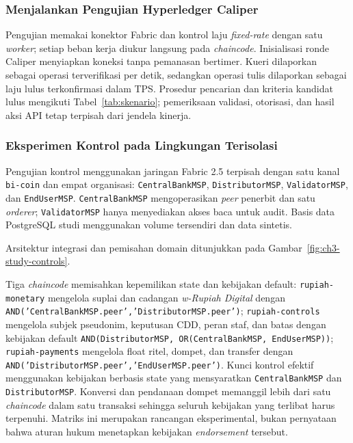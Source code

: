 \subsubsection{Menjalankan Pengujian Hyperledger Caliper}

Pengujian memakai konektor Fabric dan kontrol laju \textit{fixed-rate} dengan
satu \textit{worker}; setiap beban kerja diukur langsung pada
\textit{chaincode}. Inisialisasi ronde Caliper menyiapkan koneksi tanpa
pemanasan bertimer. Kueri dilaporkan sebagai operasi terverifikasi per detik,
sedangkan operasi tulis dilaporkan sebagai laju lulus terkonfirmasi dalam TPS. Prosedur pencarian
dan kriteria kandidat lulus mengikuti Tabel~\ref{tab:skenario}; pemeriksaan
validasi, otorisasi, dan hasil aksi API tetap terpisah dari jendela kinerja.

\subsubsection{Eksperimen Kontrol pada Lingkungan Terisolasi}

Pengujian kontrol menggunakan jaringan Fabric 2.5 terpisah dengan satu kanal
\texttt{bi-coin} dan empat organisasi: \texttt{CentralBankMSP},
\texttt{DistributorMSP}, \texttt{ValidatorMSP}, dan \texttt{EndUserMSP}.
\texttt{CentralBankMSP} mengoperasikan \textit{peer} penerbit dan satu
\textit{orderer}; \texttt{ValidatorMSP} hanya menyediakan akses baca untuk
audit. Basis data PostgreSQL studi menggunakan volume tersendiri dan data
sintetis.

Arsitektur integrasi dan pemisahan domain ditunjukkan pada
Gambar~\ref{fig:ch3-study-controls}.


Tiga \textit{chaincode} memisahkan kepemilikan state dan kebijakan default:
\texttt{rupiah-monetary} mengelola suplai dan cadangan \textit{w-Rupiah Digital} dengan
\texttt{AND('CentralBankMSP.peer','DistributorMSP.peer')};
\texttt{rupiah-controls} mengelola subjek pseudonim, keputusan CDD,
peran staf, dan batas dengan kebijakan default
\texttt{AND(DistributorMSP, OR(CentralBankMSP, EndUserMSP))};
\texttt{rupiah-payments} mengelola float ritel, dompet, dan transfer dengan
\texttt{AND('DistributorMSP.peer','EndUserMSP.peer')}. Kunci kontrol efektif
menggunakan kebijakan berbasis state yang mensyaratkan
\texttt{CentralBankMSP} dan \texttt{DistributorMSP}. Konversi dan pendanaan dompet
memanggil lebih dari satu \textit{chaincode} dalam satu transaksi sehingga seluruh
kebijakan yang terlibat harus terpenuhi. Matriks ini merupakan rancangan
eksperimental, bukan pernyataan bahwa aturan hukum menetapkan kebijakan
\textit{endorsement} tersebut.

